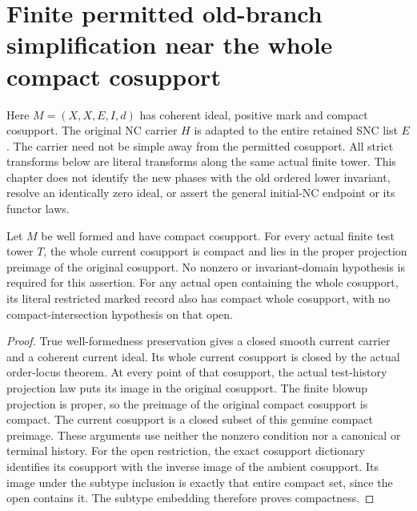 \section{Finite permitted old-branch simplification near the whole compact cosupport}
\label{sec:nc-permitted-finite-prephase}

Here $M=(X,X,E,I,d)$ has coherent ideal, positive mark and compact
cosupport. The original NC carrier $H$ is adapted to the entire retained
SNC list $E$. The carrier need not be simple away from the permitted
cosupport. All strict transforms below are literal transforms along the
same actual finite tower. This chapter does not identify the new phases
with the old ordered lower invariant, resolve an identically zero ideal,
or assert the general initial-NC endpoint or its functor laws.

\begin{lemma}
\label{hir:nc-compact-current-cosupport-without-domain}
\leanok
Let $M$ be well formed and have compact cosupport. For every actual finite
test tower $T$, the whole current cosupport is compact and lies in the
proper projection preimage of the original cosupport. No nonzero or
invariant-domain hypothesis is required for this assertion.
For any actual open containing the whole cosupport, its literal restricted
marked record also has compact whole cosupport, with no compact-intersection
hypothesis on that open.
\end{lemma}
\begin{proof}
True well-formedness preservation gives a closed smooth current carrier
and a coherent current ideal. Its whole current cosupport is closed by
the actual order-locus theorem. At every point of that cosupport, the
actual test-history projection law puts its image in the original
cosupport. The finite blowup projection is proper, so the preimage of
the original compact cosupport is compact. The current cosupport is a
closed subset of this genuine compact preimage. These arguments use
neither the nonzero condition nor a canonical or terminal history.
For the open restriction, the exact cosupport dictionary identifies its
cosupport with the inverse image of the ambient cosupport. Its image
under the subtype inclusion is exactly that entire compact set, since
the open contains it. The subtype embedding therefore proves compactness.
\end{proof}


